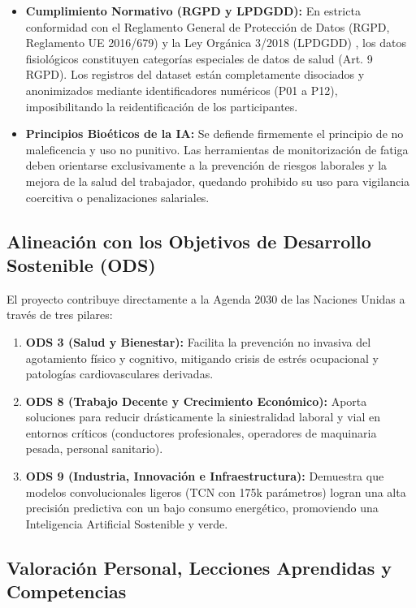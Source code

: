\begin{itemize}
    \item \textbf{Cumplimiento Normativo (RGPD y LPDGDD):} En estricta conformidad con el Reglamento General de Protección de Datos (RGPD, Reglamento UE 2016/679) y la Ley Orgánica 3/2018 (LPDGDD) \cite{boe2018lpdgdd}, los datos fisiológicos constituyen categorías especiales de datos de salud (Art. 9 RGPD). Los registros del dataset \fatigueset{} están completamente disociados y anonimizados mediante identificadores numéricos (P01 a P12), imposibilitando la reidentificación de los participantes.
    \item \textbf{Principios Bioéticos de la IA:} Se defiende firmemente el principio de no maleficencia y uso no punitivo. Las herramientas de monitorización de fatiga deben orientarse exclusivamente a la prevención de riesgos laborales y la mejora de la salud del trabajador, quedando prohibido su uso para vigilancia coercitiva o penalizaciones salariales.
\end{itemize}

\subsection{Alineación con los Objetivos de Desarrollo Sostenible (ODS)}
\label{sec:concl_ods}

El proyecto contribuye directamente a la Agenda 2030 de las Naciones Unidas \cite{onu2015ods} a través de tres pilares:
\begin{enumerate}
    \item \textbf{ODS 3 (Salud y Bienestar):} Facilita la prevención no invasiva del agotamiento físico y cognitivo, mitigando crisis de estrés ocupacional y patologías cardiovasculares derivadas.
    \item \textbf{ODS 8 (Trabajo Decente y Crecimiento Económico):} Aporta soluciones para reducir drásticamente la siniestralidad laboral y vial en entornos críticos (conductores profesionales, operadores de maquinaria pesada, personal sanitario).
    \item \textbf{ODS 9 (Industria, Innovación e Infraestructura):} Demuestra que modelos convolucionales ligeros (TCN con 175k parámetros) logran una alta precisión predictiva con un bajo consumo energético, promoviendo una Inteligencia Artificial Sostenible y verde.
\end{enumerate}

\subsection{Valoración Personal, Lecciones Aprendidas y Competencias}
\label{sec:concl_valoracion}

